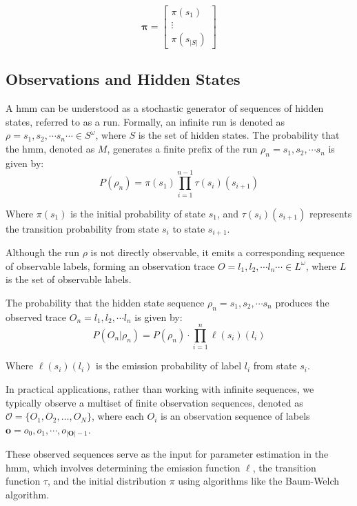 \[
    \pmb{\pi} = \begin{bmatrix}
              \pi(s_1) \\
              \vdots   \\
              \pi(s_{|S|})
    \end{bmatrix}
\]

\subsection{Observations and Hidden States}\label{subsec:observations-hidden-states}
A \gls{hmm} can be understood as a stochastic generator of sequences of hidden states, referred to as a run. 
Formally, an infinite run is denoted as $\rho = s_1, s_2, \cdots s_n \cdots \in S^{\omega}$, where $S$ is the set of hidden states. 
The probability that the \gls{hmm}, denoted as $M$, generates a finite prefix of the run $\rho_n = s_1, s_2, \cdots s_n$ is given by:
\begin{equation}
    P(\rho_n) = \pi(s_1) \prod_{i = 1}^{n-1} \tau(s_i)(s_{i+1})
\end{equation}

Where $\pi(s_1)$ is the initial probability of state $s_1$, and $\tau(s_i)(s_{i+1})$ represents the transition probability from state $s_i$ to state $s_{i+1}$.

Although the run $\rho$ is not directly observable, it emits a corresponding sequence of observable labels, forming an observation trace $O = l_1, l_2, \cdots l_n \cdots \in L^{\omega}$, where $L$ is the set of observable labels.

The probability that the hidden state sequence $\rho_n = s_1, s_2, \cdots s_n$ produces the observed trace $O_n = l_1, l_2, \cdots l_n$ is given by:
\begin{equation}
    P(O_n | \rho_n) = P(\rho_n) \cdot \prod_{i = 1}^{n} \ell(s_i)(l_i)
\end{equation}

Where $\ell(s_i)(l_i)$ is the emission probability of label $l_i$ from state $s_i$.

In practical applications, rather than working with infinite sequences, we typically observe a multiset of finite observation sequences, denoted as $\mathcal{O} = \{O_1, O_2, \ldots, O_N\}$, where each $O_i$ is an observation sequence of labels $\mathbf{o} = o_0, o_1, \cdots, o_{|\mathbf{O}|-1}$.

These observed sequences serve as the input for parameter estimation in the \gls{hmm}, which involves determining the emission function $\ell$, the transition function $\tau$, and the initial distribution $\pi$ using algorithms like the Baum-Welch algorithm.

